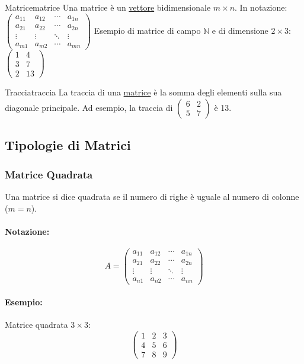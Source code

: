 \documentclass{article}
\begin{document}
\begin{definition}{Matrice}{matrice}
    Una matrice è un \hyperref[def:vettore]{vettore} bidimensionale $m \times n$. In notazione: $\begin{pmatrix}
    a_{11} & a_{12} & \cdots & a_{1n} \\
    a_{21} & a_{22} & \cdots & a_{2n} \\
    \vdots & \vdots & \ddots & \vdots \\
    a_{m1} & a_{m2} & \cdots & a_{mn}
    \end{pmatrix}$ Esempio di matrice di campo $\mathbb{N}$ e di dimensione $2 \times 3$: $\begin{pmatrix}
    1 & 4 \\
    3 & 7 \\
    2 & 13
    \end{pmatrix}$
\end{definition}

\begin{definition}{Traccia}{traccia}
    La traccia di una \hyperref[def:matrice]{matrice} è la somma degli elementi sulla sua diagonale principale. Ad esempio, la traccia di $\begin{pmatrix} 6 & 2 \\ 5 & 7 \end{pmatrix}$ è 13.
\end{definition}

\subsection{Tipologie di Matrici}

\subsubsection*{Matrice Quadrata}
Una matrice si dice quadrata se il numero di righe è uguale al numero di colonne ($m=n$).
\paragraph{Notazione:}
\[ A = \begin{pmatrix}
a_{11} & a_{12} & \cdots & a_{1n} \\
a_{21} & a_{22} & \cdots & a_{2n} \\
\vdots & \vdots & \ddots & \vdots \\
a_{n1} & a_{n2} & \cdots & a_{nn}
\end{pmatrix} \]
\paragraph{Esempio:} Matrice quadrata $3 \times 3$:
\[ \begin{pmatrix}
1 & 2 & 3 \\
4 & 5 & 6 \\
7 & 8 & 9
\end{pmatrix} \]
\end{document}
